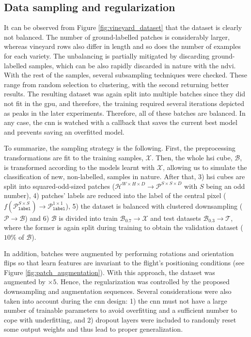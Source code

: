 \subsection{Data sampling and regularization}

It can be observed from Figure \ref{fig:vineyard_dataset} that the dataset is clearly not balanced. The number of ground-labelled patches is considerably larger, whereas vineyard rows also differ in length and so does the number of examples for each variety. The unbalancing is partially mitigated by discarding ground-labelled samples, which can be also rapidly discarded in nature with the \acrshort{ndvi}. With the rest of the samples, several subsampling techniques were checked. These range from random selection to clustering, with the second returning better results. The resulting dataset was again split into multiple batches since they did not fit in the \acrshort{gpu}, and therefore, the training required several iterations depicted as peaks in the later experiments. Therefore, all of these batches are balanced. In any case, the \acrshort{cnn} is watched with a callback that saves the current best model and prevents saving an overfitted model.

To summarize, the sampling strategy is the following. First, the preprocessing transformations are fit to the training samples, $\mathcal{X}$. Then, the whole \acrshort{hsi} cube, $\mathcal{B}$, is transformed according to the models learnt with $\mathcal{X}$, allowing us to simulate the classification of new, non-labelled, samples in nature. After that, 3) \acrshort{hsi} cubes are split into squared-odd-sized patches ($\mathcal{H}^{W \times H \times D} \rightarrow \mathcal{P}^{S \times S \times D}$ with $S$ being an odd number), 4) patches' labels are reduced into the label of the central pixel ($f(\mathcal{P}_{\texttt{label}}^{S \times S}) \rightarrow \mathcal{P}_{\texttt{label}}^{1 \times 1}$), 5) the dataset is balanced with clustered downsampling ($\mathcal{P} \rightarrow \mathcal{B}$) and 6) $\mathcal{B}$ is divided into train $\mathcal{B}_{0.7} \rightarrow \mathcal{X}$ and test datasets $\mathcal{B}_{0.3} \rightarrow \mathcal{T}$, where the former is again split during training to obtain the validation dataset ($10\%$ of $\mathcal{B}$).

In addition, batches were augmented by performing rotations and orientation flips so that learn features are invariant to the flight's positioning conditions (see Figure \ref{fig:patch_augmentation}). With this approach, the dataset was augmented by $\times 5$. Hence, the regularization was controlled by the proposed downsampling and augmentation sequences. Several considerations were also taken into account during the \acrshort{cnn} design: 1) the \acrshort{cnn} must not have a large number of trainable parameters to avoid overfitting and a sufficient number to cope with underfitting, and 2) dropout layers were included to randomly reset some output weights and thus lead to proper generalization.

